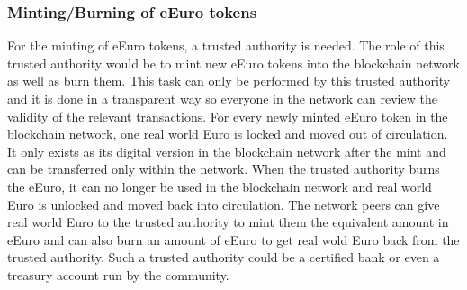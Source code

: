 \subsubsection{Minting/Burning of eEuro tokens}
For the minting of eEuro tokens, a trusted authority is needed. The role of this trusted authority would be to mint new eEuro tokens into the blockchain network as well as burn them. This
task can only be performed by this trusted authority and it is done in a transparent way so everyone in the network can review the validity of the relevant transactions.
For every newly minted eEuro token in the blockchain network, one real world Euro is locked and moved out of circulation. It only exists as its digital version in the blockchain network after the mint
and can be transferred only within the network. When the trusted authority burns the eEuro, it can no longer be used in the blockchain network and real world Euro is unlocked and moved back into circulation.
The network peers can give real world Euro to the trusted authority to mint them the equivalent amount in eEuro and can also burn an amount of eEuro to get real wold Euro back from the trusted authority.
Such a trusted authority could be a certified bank or even a treasury account run by the community.\\
